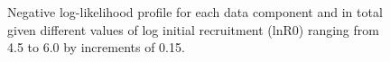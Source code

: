 \documentclass[
]{scrartcl}
\begin{document}
\begin{figure}


\caption{\label{fig-rzero-piner}Negative log-likelihood profile for each
data component and in total given different values of log initial
recruitment (lnR0) ranging from 4.5 to 6.0 by increments of 0.15.}

\end{figure}%
\end{document}
